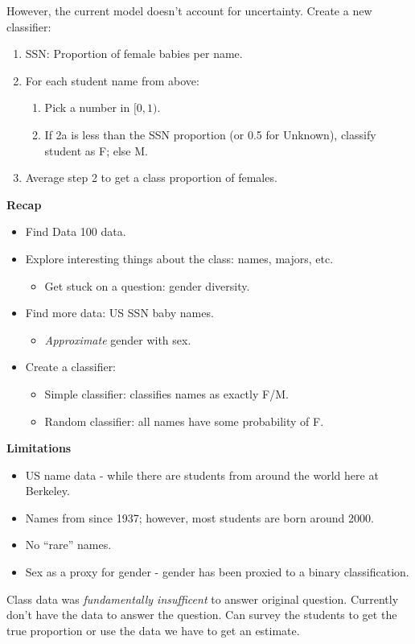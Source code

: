 \begin{example}
{However, the current model doesn't account for uncertainty. Create a new classifier:
\begin{enumerate}
\item SSN: Proportion of female babies per name.
\item For each student name from above:
\begin{enumerate}
\item Pick a number in $[0, 1)$.
\item If 2a is less than the SSN proportion (or 0.5 for Unknown), classify student as F; else M.
\end{enumerate}
\item Average step 2 to get a class proportion of females.
\end{enumerate}
\tcbline
\textbf{Recap}
\begin{itemize}
\item Find Data 100 data.
\item Explore interesting things about the class: names, majors, etc.
\begin{itemize}
\item Get stuck on a question: gender diversity.
\end{itemize}
\item Find more data: US SSN baby names.
\begin{itemize}
\item \textit{Approximate} gender with sex.
\end{itemize}
\item Create a classifier:
\begin{itemize}
\item Simple classifier: classifies names as exactly F/M.
\item Random classifier: all names have some probability of F.
\end{itemize}
\end{itemize}

\textbf{Limitations}
\begin{itemize}
\item US name data - while there are students from around the world here at Berkeley.
\item Names from since 1937; however, most students are born around 2000.
\item No ``rare'' names.
\item Sex as a proxy for gender - gender has been proxied to a binary classification.
\end{itemize}
Class data was \textit{fundamentally insufficent} to answer original question. Currently don't have the data to answer the question. Can survey the students to get the true proportion or use the data we have to get an estimate.
}
\end{example}
